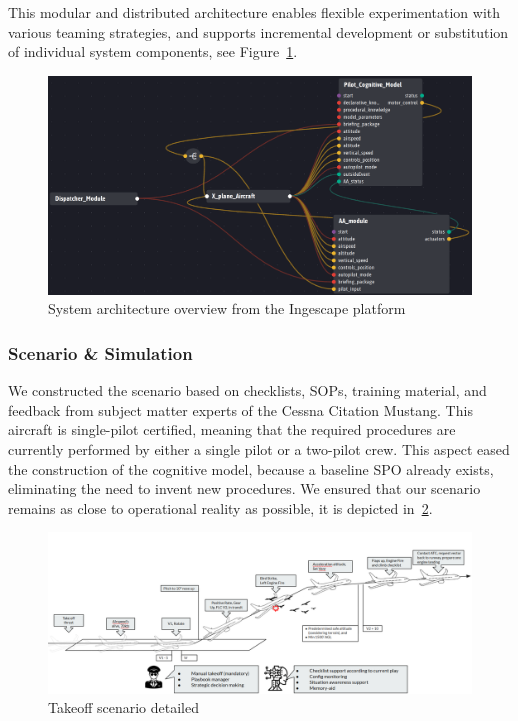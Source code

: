 \documentclass[12pt,a4paper]{article} %
\begin{document}
	This modular and distributed architecture enables flexible experimentation with various teaming strategies, and supports incremental development or substitution of individual system components, see Figure~\ref{fig:ingescape_platform}.
	
	\begin{figure}[H] 
		\centering
		\includegraphics[width=1.0\textwidth]{./images/ingescape_platform.png}
		\caption{System architecture overview from the Ingescape platform}
		\label{fig:ingescape_platform}
	\end{figure}
	

	\subsubsection{Scenario \& Simulation}
	We constructed the scenario based on checklists, SOPs, training material, and feedback from subject matter experts of the Cessna Citation Mustang. This aircraft is single-pilot certified, meaning that the required procedures are currently performed by either a single pilot or a two-pilot crew. This aspect eased the construction of the cognitive model, because a baseline SPO already exists, eliminating the need to invent new procedures. We ensured that our scenario remains as close to operational reality as possible, it is depicted in~\ref{fig:scenario_detailed}.

	\begin{figure}[H]
		\centering
		\includegraphics[width=1.0\textwidth]{./images/scenario_detailed.png}
		\caption{Takeoff scenario detailed}
		\label{fig:scenario_detailed}
	\end{figure}
\end{document}
